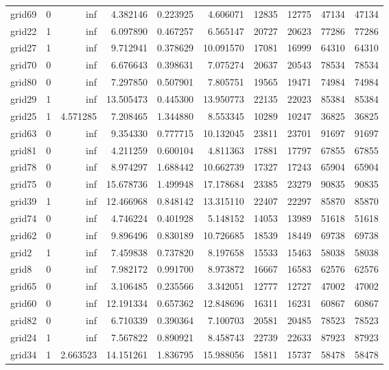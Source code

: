 \begin{longtable}{|l|r|r|r|r|r|r|r|r|r|}
grid69 & 0 & inf & 4.382146 & 0.223925 & 4.606071 & 12835 & 12775 & 47134 & 47134 \\
grid22 & 1 & inf & 6.097890 & 0.467257 & 6.565147 & 20727 & 20623 & 77286 & 77286 \\
grid27 & 1 & inf & 9.712941 & 0.378629 & 10.091570 & 17081 & 16999 & 64310 & 64310 \\
grid70 & 0 & inf & 6.676643 & 0.398631 & 7.075274 & 20637 & 20543 & 78534 & 78534 \\
grid80 & 0 & inf & 7.297850 & 0.507901 & 7.805751 & 19565 & 19471 & 74984 & 74984 \\
grid29 & 1 & inf & 13.505473 & 0.445300 & 13.950773 & 22135 & 22023 & 85384 & 85384 \\
grid25 & 1 & 4.571285 & 7.208465 & 1.344880 & 8.553345 & 10289 & 10247 & 36825 & 36825 \\
grid63 & 0 & inf & 9.354330 & 0.777715 & 10.132045 & 23811 & 23701 & 91697 & 91697 \\
grid81 & 0 & inf & 4.211259 & 0.600104 & 4.811363 & 17881 & 17797 & 67855 & 67855 \\
grid78 & 0 & inf & 8.974297 & 1.688442 & 10.662739 & 17327 & 17243 & 65904 & 65904 \\
grid75 & 0 & inf & 15.678736 & 1.499948 & 17.178684 & 23385 & 23279 & 90835 & 90835 \\
grid39 & 1 & inf & 12.466968 & 0.848142 & 13.315110 & 22407 & 22297 & 85870 & 85870 \\
grid74 & 0 & inf & 4.746224 & 0.401928 & 5.148152 & 14053 & 13989 & 51618 & 51618 \\
grid62 & 0 & inf & 9.896496 & 0.830189 & 10.726685 & 18539 & 18449 & 69738 & 69738 \\
grid2 & 1 & inf & 7.459838 & 0.737820 & 8.197658 & 15533 & 15463 & 58038 & 58038 \\
grid8 & 0 & inf & 7.982172 & 0.991700 & 8.973872 & 16667 & 16583 & 62576 & 62576 \\
grid65 & 0 & inf & 3.106485 & 0.235566 & 3.342051 & 12777 & 12727 & 47002 & 47002 \\
grid60 & 0 & inf & 12.191334 & 0.657362 & 12.848696 & 16311 & 16231 & 60867 & 60867 \\
grid82 & 0 & inf & 6.710339 & 0.390364 & 7.100703 & 20581 & 20485 & 78523 & 78523 \\
grid24 & 1 & inf & 7.567822 & 0.890921 & 8.458743 & 22739 & 22633 & 87923 & 87923 \\
grid34 & 1 & 2.663523 & 14.151261 & 1.836795 & 15.988056 & 15811 & 15737 & 58478 & 58478 \\

\end{longtable}
